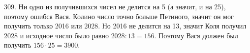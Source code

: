 309. Ни одно из получившихся чисел не делится на 5 (а значит, и на 25), поэтому ошибся Вася. Колино число точно больше Петиного, значит он мог получить только 2016 или 2028. Но 2016 не делится на 13, значит Коля получил 2028 и исходное число было равно $2028:13=156.$ Поэтому Вася должен был получить $156\cdot25=3900.$\\
